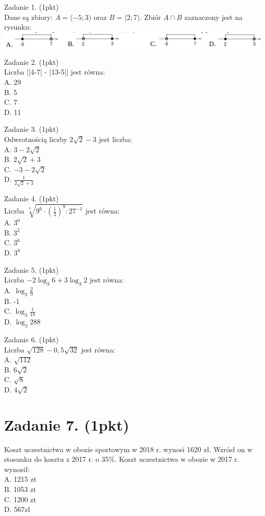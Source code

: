 \documentclass[10pt]{article}
\begin{document}
Zadanie 1. (1pkt)\\
Dane są zbiory: \(A=\langle-5 ; 3)\) oraz \(B=\langle 2 ; 7)\). Zbiór \(A \cap B\) zaznaczony jest na rysunku:\\
\includegraphics[max width=\textwidth, center]{2024_11_21_0fa17f80dfe1c6bd3b66g-02}

Zadanie 2. (1pkt)\\
Liczba ||4-7| - |13-5|| jest równa:\\
A. 29\\
B. 5\\
C. 7\\
D. 11

Zadanie 3. (1pkt)\\
Odwrotnością liczby \(2 \sqrt{2}-3\) jest liczba:\\
A. \(3-2 \sqrt{2}\)\\
B. \(2 \sqrt{2}+3\)\\
C. \(-3-2 \sqrt{2}\)\\
D. \(\frac{1}{2 \sqrt{2}+3}\)

Zadanie 4. (1pkt)\\
Liczba \(\sqrt[3]{9^{6} \cdot\left(\frac{1}{3}\right)^{9}: 27^{-1}}\) jest równa:\\
A. \(3^{0}\)\\
B. \(3^{2}\)\\
C. \(3^{6}\)\\
D. \(3^{8}\)

Zadanie 5. (1pkt)\\
Liczba \(-2 \log _{3} 6+3 \log _{3} 2\) jest równa:\\
A. \(\log _{3} \frac{2}{9}\)\\
B. -1\\
C. \(\log _{3} \frac{1}{18}\)\\
D. \(\log _{3} 288\)

Zadanie 6. (1pkt)\\
Liczba \(\sqrt{128}-0,5 \sqrt{32}\) jest równa:\\
A. \(\sqrt{112}\)\\
B. \(6 \sqrt{2}\)\\
C. \(\sqrt{8}\)\\
D. \(4 \sqrt{2}\)

\section*{Zadanie 7. (1pkt)}
Koszt uczestnictwa w obozie sportowym w 2018 r. wynosi 1620 zł. Wzrósł on w stosunku do kosztu z 2017 r. o 35\%. Koszt uczestnictwa w obozie w 2017 r. wynosił:\\
A. 1215 zt\\
B. 1053 zt\\
C. 1200 zt\\
D. \(567 \mathrm{zł}\)
\end{document}
